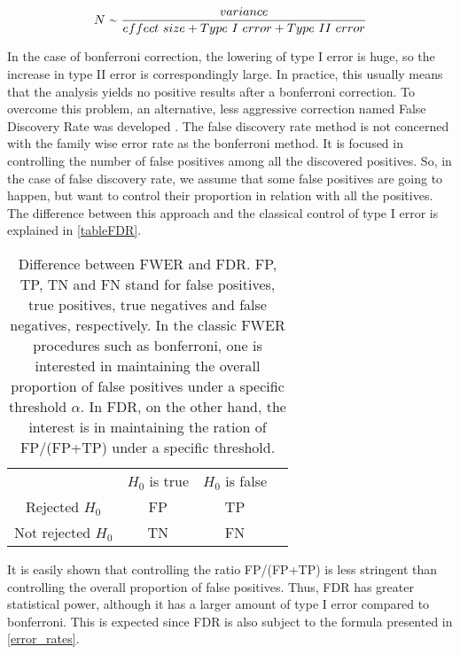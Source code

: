 \begin{equation}
\label{error_rates}
    N\ {\raise.17ex\hbox{$\scriptstyle\sim$}}\ \frac{variance}{effect\ size + Type\ I\ error + Type\ II\ error}
\end{equation}

In the case of bonferroni correction, the lowering of type I error is huge, so the increase in type II error is correspondingly large. In practice, this usually means that the analysis yields no positive results after a bonferroni correction. To overcome this problem, an alternative, less aggressive correction named False Discovery Rate was developed  \parencite{benjamini1995controlling}. The false discovery rate method is not concerned with the family wise error rate as the bonferroni method. It is focused in controlling the number of false positives among all the discovered positives. So, in the case of false discovery rate, we assume that some false positives are going to happen, but want to control their proportion in relation with all the positives. The difference between this approach and the classical control of type I error is explained in \autoref{tableFDR}.

\begin{table}[h!]
\begin{center}
\begin{tabular}{ |c|c|c|c| } 
 \hline
 \  & $H_0$ is true & $H_0$ is false \\ 
 Rejected $H_0$ & FP & TP \\ 
 Not rejected $H_0$ & TN & FN \\ 
 \hline
\end{tabular}
\caption{Difference between FWER and FDR. FP, TP, TN and FN stand for false positives, true positives, true negatives and false negatives, respectively. In the classic FWER procedures such as bonferroni, one is interested in maintaining the overall proportion of false positives under a specific threshold $\alpha$. In FDR, on the other hand, the interest is in maintaining the ration of FP/(FP+TP) under a specific threshold.}
\label{tableFDR}
\end{center}
\end{table}

It is easily shown that controlling the ratio FP/(FP+TP) is less stringent than controlling the overall proportion of false positives. Thus, FDR has greater statistical power, although it has a larger amount of type I error compared to bonferroni. This is expected since FDR is also subject to the formula presented in \autoref{error_rates}.


